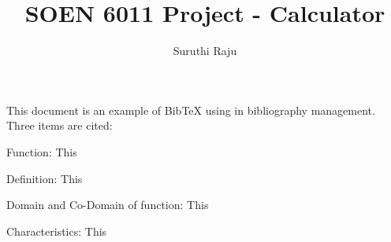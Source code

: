 \documentclass[a4paper,10pt]{article}
\title{SOEN 6011 Project - Calculator}
\author{Suruthi Raju}
\begin{document}
\maketitle

{\fontsize{12}{16}\selectfont This document is an example of BibTeX using in bibliography management. Three items are cited: \\} 

{\Large Function:}
\newline
\indent\indent
{\fontsize{12}{16}\selectfont This \\}

{\Large Definition:}
\newline
\indent\indent
{\fontsize{12}{16}\selectfont This \\}

{\Large Domain and Co-Domain of function:}
\newline
\indent\indent
{\fontsize{12}{16}\selectfont This \\}

{\Large Characteristics:}
\newline
\indent\indent
{\fontsize{12}{16}\selectfont This \\}
\end{document}
